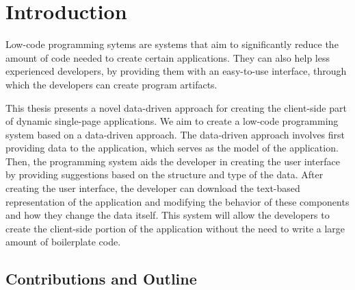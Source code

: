 \chapter*{Introduction}
Low-code programming sytems are systems that aim to significantly reduce the amount of code needed to create certain applications.
They can also help less experienced developers, by providing them with an easy-to-use interface, through which the developers can create program artifacts.

This thesis presents a novel data-driven approach for creating the client-side part of dynamic single-page applications.
We aim to create a low-code programming system based on a data-driven approach.
The data-driven approach involves first providing data to the application, which serves as the model of the application.
Then, the programming system aids the developer in creating the user interface by providing suggestions based on the structure and type of the data.
After creating the user interface, the developer can download the text-based representation of the application and modifying the behavior of these components and how they change the data itself.
This system will allow the developers to create the client-side portion of the application without the need to write a large amount of boilerplate code.


\section* {Contributions and Outline}


